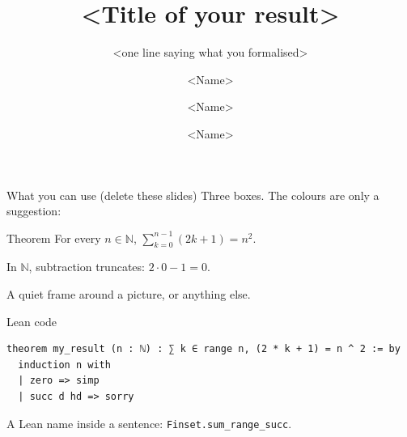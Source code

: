 \documentclass[11pt,aspectratio=169]{beamer}
\title{<Title of your result>}
\subtitle{<one line saying what you formalised>}
\author{<Name> \and <Name> \and <Name>}
\institute{Perspectives in Mathematics --- Theme 3B}
\date{}
\newcommand{\lean}[1]{\texttt{#1}}
\begin{document}
\begin{frame}
  \titlepage
\end{frame}

%
%
%
%


\begin{frame}{What you can use (delete these slides)}
  Three boxes. The colours are only a suggestion:
  \begin{keybox}{Theorem}
    For every $n \in \mathbb{N}$, \quad
    $\displaystyle\sum_{k=0}^{n-1}(2k+1) = n^2$.
  \end{keybox}
  \begin{notebox}
    In $\mathbb{N}$, subtraction truncates: $2 \cdot 0 - 1 = 0$.
  \end{notebox}
  \begin{plainbox}
    \centering A quiet frame around a picture, or anything else.
  \end{plainbox}
\end{frame}

\begin{frame}[fragile]{Lean code}
\begin{lstlisting}
theorem my_result (n : ℕ) : ∑ k ∈ range n, (2 * k + 1) = n ^ 2 := by
  induction n with
  | zero => simp
  | succ d hd => sorry
\end{lstlisting}
  A Lean name inside a sentence: \lean{Finset.sum\_range\_succ}.
\end{frame}
\end{document}
